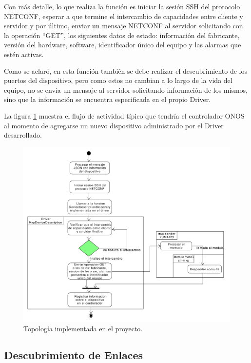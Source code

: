     Con más detalle, lo que realiza la función es iniciar la sesión SSH del protocolo NETCONF, esperar a que termine el intercambio de capacidades entre cliente y servidor y por último, enviar un mensaje NETCONF al servidor solicitando con la operación “GET”, los siguientes datos de estado:  información del fabricante, versión del hardware, software, identificador único del equipo y las alarmas que estén activas. 

    Como se aclaró, en esta función también se debe realizar el descubrimiento de los puertos del dispositivo, pero como estos no cambian a lo largo de la vida del equipo, no se envía un mensaje al servidor solicitando información de los mismos, sino que la información se encuentra especificada en el propio Driver.

    La figura \ref{fig:actividad_driver_descr} muestra el flujo de actividad típico que tendría el controlador ONOS al momento de agregarse un nuevo dispositivo administrado por el Driver desarrollado.
    
    \begin{figure}[H]
        \centering
        \includegraphics[scale=0.45]{Figures/actividad_driver_descr.pdf}
        \caption{Topología implementada en el proyecto.}
        \label{fig:actividad_driver_descr}
      \end{figure}

\subsection{Descubrimiento de Enlaces}

